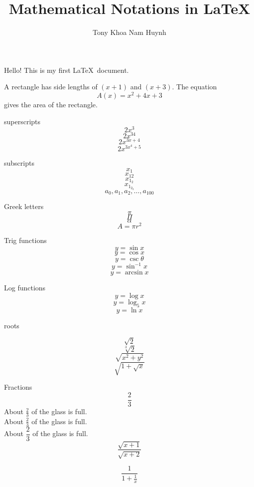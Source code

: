 \documentclass[11pt, letterpaper, twoside]{article}
\title{Mathematical Notations in \LaTeX}
\author{Tony Khoa Nam Huynh}
\begin{document}
\maketitle
Hello! This is my first \LaTeX\ document.

A rectangle has side lengths of $(x+1)$ and $(x+3)$.
The equation $${A(x)=x^2+4x+3}$$ gives the area of the rectangle.

superscripts $$2x^3$$
$$2x^{34}$$
$$2x^{3x+4}$$
$$2x^{3x^4+5}$$

subscripts
$$x_1$$
$$x_{12}$$
$$x_{1_2}$$
$$x_{1_{2_3}}$$
$$a_0,a_1,a_2,\ldots, a_{100}$$

Greek letters
$$\pi$$
$$\Pi$$
$$\alpha$$
$$A=\pi r^2$$

Trig functions
$$y=\sin x$$
$$y=\cos x$$
$$y=\csc \theta$$
$$y=\sin^{-1} x$$
$$y=\arcsin x$$

Log functions
$$y=\log x$$
$$y=\log_5 x$$
$$y=\ln x$$

roots

$$\sqrt{2}$$
$$\sqrt[3]{2}$$
$$\sqrt{x^2+y^2}$$
$$\sqrt{    1+\sqrt{x}  }$$

Fractions
$$\frac{2}{3}$$ %
About $\frac{2}{3}$ of the glass is full.\\[16pt]
About $\displaystyle \frac{2}{3}$ of the glass is full.\\[6pt]
About $\dfrac{2}{3}$ of the glass is full.\\[6pt]

$$\frac{\sqrt{x+1}}{\sqrt{x+2}}$$

$$\frac{1}{1+\frac{1}{x}}$$
\end{document}
